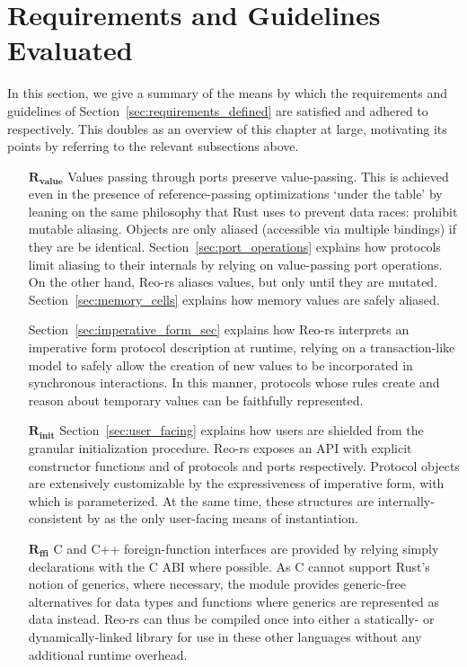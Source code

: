 \section{Requirements and Guidelines Evaluated}
\label{sec:requirements_evaluated}
In this section, we give a summary of the means by which the requirements and guidelines of Section~\ref{sec:requirements_defined} are satisfied and adhered to respectively. This doubles as an overview of this chapter at large, motivating its points by referring to the relevant subsections above.


\begin{enumerate}
	\item[$\boldsymbol{R_{value}}$] Values passing through ports preserve value-passing. This is achieved even in the presence of reference-passing optimizations `under the table' by leaning on the same philosophy that Rust uses to prevent data races: prohibit mutable aliasing. Objects are only aliased (accessible via multiple bindings) if they are be identical. Section~\ref{sec:port_operations} explains how protocols limit aliasing to their internals by relying on value-passing port operations. On the other hand, Reo-rs aliases values, but only until they are mutated. Section~\ref{sec:memory_cells} explains how memory values are safely aliased.
	
	Section~\ref{sec:imperative_form_sec} explains how Reo-rs interprets an imperative form protocol description at runtime, relying on a transaction-like model to safely allow the creation of new values to be incorporated in synchronous interactions. In this manner, protocols whose rules create and reason about temporary values can be faithfully represented.
	
	\item[$\boldsymbol{R_{init}}$] Section~\ref{sec:user_facing} explains how users are shielded from the granular initialization procedure. Reo-rs exposes an API with explicit constructor functions  and  of protocols and ports respectively. Protocol objects are extensively customizable by the expressiveness of imperative form, with which  is parameterized. At the same time, these structures are internally-consistent by  as the only user-facing means of instantiation.
	
	\item[$\boldsymbol{R_{ffi}}$] C and C++ foreign-function interfaces are provided by relying simply declarations with the C ABI where possible. As C cannot support Rust's notion of generics, where necessary, the  module provides generic-free alternatives for data types and functions where generics are represented as data instead. Reo-rs can thus be compiled once into either a statically- or dynamically-linked library for use in these other languages without any additional runtime overhead.
	

\end{enumerate}
